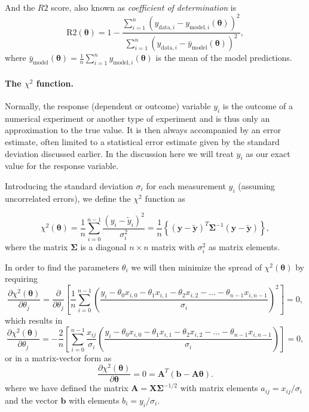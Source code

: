 \documentclass[%
oneside,                 %
final,                   %
10pt]{article}
\newenvironment{block_mdfboxadmon}[1][]{
\begin{block_mdfboxmdframed}[frametitle=#1]
}
{
\end{block_mdfboxmdframed}
}
\begin{document}
And the $R2$ score, also known as \emph{coefficient of determination} is
\[
\mathrm{R2}(\bm{\theta}) = 1 - \frac{\sum_{i=1}^n \left( y_{\mathrm{data},i} - y_{\mathrm{model},i}(\bm{\theta}) \right)^2}{\sum_{i=1}^n \left( y_{\mathrm{data},i} - \bar{y}_\mathrm{model}(\bm{\theta}) \right)^2},
\]
where $\bar{y}_\mathrm{model}(\bm{\theta}) = \frac{1}{n} \sum_{i=1}^n y_{\mathrm{model},i} (\bm{\theta})$ is the mean of the model predictions.


\paragraph{The $\chi^2$ function.}

\begin{block_mdfboxadmon}[]

Normally, the response (dependent or outcome) variable $y_i$ is the
outcome of a numerical experiment or another type of experiment and is
thus only an approximation to the true value. It is then always
accompanied by an error estimate, often limited to a statistical error
estimate given by the standard deviation discussed earlier. In the
discussion here we will treat $y_i$ as our exact value for the
response variable.

Introducing the standard deviation $\sigma_i$ for each measurement
$y_i$ (assuming uncorrelated errors), we define the $\chi^2$ function as

\[
\chi^2(\bm{\theta})=\frac{1}{n}\sum_{i=0}^{n-1}\frac{\left(y_i-\tilde{y}_i\right)^2}{\sigma_i^2}=\frac{1}{n}\left\{\left(\bm{y}-\bm{\tilde{y}}\right)^T \bm{\Sigma}^{-1}\left(\bm{y}-\bm{\tilde{y}}\right)\right\},
\]
where the matrix $\bm{\Sigma}$ is a diagonal $n \times n$ matrix with $\sigma_i^2$ as matrix elements.
\end{block_mdfboxadmon} %




\begin{block_mdfboxadmon}[]

In order to find the parameters $\theta_i$ we will then minimize the spread of $\chi^2(\bm{\theta})$ by requiring
\[
\frac{\partial \chi^2(\bm{\theta})}{\partial \theta_j} = \frac{\partial }{\partial \theta_j}\left[ \frac{1}{n}\sum_{i=0}^{n-1}\left(\frac{y_i-\theta_0x_{i,0}-\theta_1x_{i,1}-\theta_2x_{i,2}-\dots-\theta_{n-1}x_{i,n-1}}{\sigma_i}\right)^2\right]=0, 
\]
which results in
\[
\frac{\partial \chi^2(\bm{\theta})}{\partial \theta_j} = -\frac{2}{n}\left[ \sum_{i=0}^{n-1}\frac{x_{ij}}{\sigma_i}\left(\frac{y_i-\theta_0x_{i,0}-\theta_1x_{i,1}-\theta_2x_{i,2}-\dots-\theta_{n-1}x_{i,n-1}}{\sigma_i}\right)\right]=0, 
\]
or in a matrix-vector form as
\[
\frac{\partial \chi^2(\bm{\theta})}{\partial \bm{\theta}} = 0 = \bm{A}^T\left( \bm{b}-\bm{A}\bm{\theta}\right).  
\]
where we have defined the matrix $\bm{A} =\bm{X} \bm{\Sigma}^{-1/2}$ with matrix elements $a_{ij} = x_{ij}/\sigma_i$ and the vector $\bm{b}$ with elements $b_i = y_i/\sigma_i$.
\end{block_mdfboxadmon} %
\end{document}

